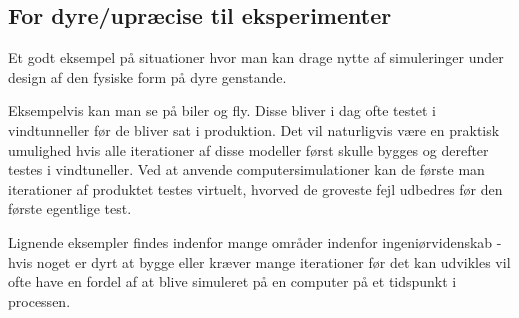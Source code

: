 \subsection{For dyre/upræcise til eksperimenter}
Et godt eksempel på situationer hvor man kan drage nytte af simuleringer under
design af den fysiske form på dyre genstande.

Eksempelvis kan man se på biler og fly. Disse bliver i dag ofte testet i
vindtunneller før de bliver sat i produktion. Det vil naturligvis være en
praktisk umulighed hvis alle iterationer af disse modeller først skulle
bygges og derefter testes i vindtuneller. Ved at anvende computersimulationer
kan de første man iterationer af produktet testes virtuelt, hvorved de groveste
fejl udbedres før den første egentlige test.

Lignende eksempler findes indenfor mange områder indenfor ingeniørvidenskab -
hvis noget er dyrt at bygge eller kræver mange iterationer før det kan udvikles
vil ofte have en fordel af at blive simuleret på en computer på et tidspunkt i
processen.
